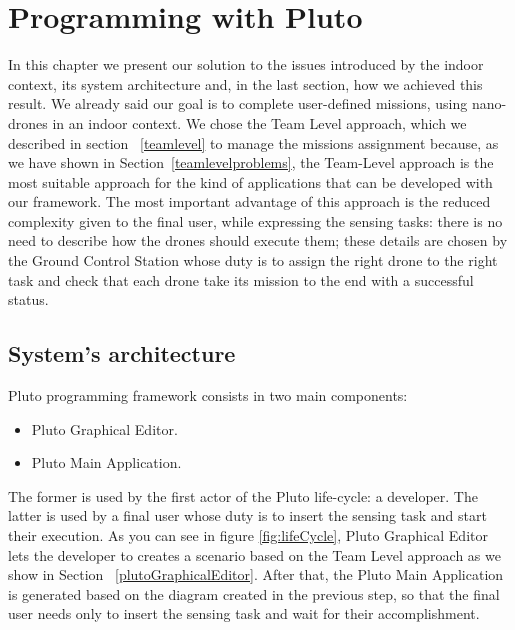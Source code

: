 \chapter{Programming with Pluto}
\label{cap4}

In this chapter we present our solution to the issues introduced by the indoor context, its system architecture and, in the last section, how we achieved this result. We already said our goal is to complete user-defined missions, using nano-drones in an indoor context. We chose the Team Level approach, which we described in section ~\ref{teamlevel} to manage the missions assignment because, as we have shown in Section~\ref{teamlevelproblems}, the Team-Level approach is the most suitable approach for the kind of applications that can be developed with our framework.
The most important advantage of this approach is the reduced complexity given to the final user, while expressing the sensing tasks: there is no need to describe how the drones should execute them; these details are chosen by the Ground Control Station whose duty is to assign the right drone to the right task and check that each drone take its mission to the end with a successful status.


\section{System's architecture}
Pluto programming framework consists in two main components:
\begin{itemize}
\item Pluto Graphical Editor.
\item Pluto Main Application.
\end{itemize}
The former is used by the first actor of the Pluto life-cycle: a developer. The latter is used by a final user whose duty is to insert the sensing task and start their execution.
As you can see in figure \ref{fig:lifeCycle}, Pluto Graphical Editor lets the developer to creates a scenario based on the Team Level approach as we show in Section ~\ref{plutoGraphicalEditor}. After that, the Pluto Main Application is generated based on the diagram created in the previous step, so that the final user needs only to insert the sensing task and wait for their accomplishment.

